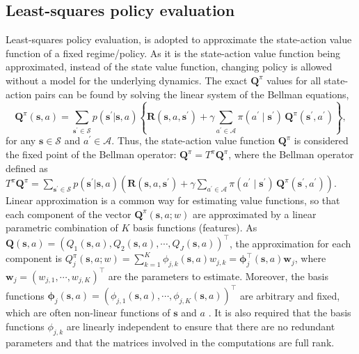 \documentclass{article}
\newcommand{\p}{\prime}
\newcommand{\bs}{ \boldsymbol}
\newcommand{\ml}{\mathcal}
\newcommand{\lt}{\left}
\newcommand{\rt}{\right}
\begin{document}
\subsection{Least-squares policy evaluation}
 Least-squares policy evaluation, is adopted to approximate the state-action value function of a fixed regime/policy. As it is the state-action value function being approximated, instead of the state value function, changing policy is allowed without a model for the underlying dynamics. The exact $\bs{Q}^{\pi}$ values for all state-action pairs can be found by solving the linear system of the Bellman equations, $$\bs{Q}^{\pi}(\bs{s}, a) =\sum_{\bs{s}^{\prime} \in \ml{S}}  p(\bs{s}^{\prime} | \bs{s}, a) \lt\{ \bs{R}(\bs{s}, a, \bs{s}^{\prime}) + \gamma \sum_{a^{\p} \in \ml{A}} \pi(a^{\prime} \mid \bs{s}^{\p} ) \,\bs{Q}^{\pi}(\bs{s}^{\prime}, a^{\prime} ) \rt\},$$ for any $\bs{s} \in \ml{S}$ and $a^{\prime} \in \ml{A}$. Thus,  the state-action value function $\bs{Q}^{\pi}$ is considered the fixed point of the Bellman operator: $\bs{Q}^{\pi}=T^{\pi}\bs{Q}^{\pi}$, where the Bellman operator defined as \\  $T^{\pi}\bs{Q}^{\pi} =\sum_{\bs{s}^{\prime} \in \ml{S}}  p(\bs{s}^{\prime} | \bs{s}, a) \lt( \bs{R}(\bs{s}, a, \bs{s}^{\prime}) + \gamma \sum_{a^{\p} \in \ml{A}} \pi(a^{\prime} \mid \bs{s}^{\p} ) \,\bs{Q}^{\pi}(\bs{s}^{\prime}, a^{\prime} ) \rt)$.\\


Linear approximation is a  common way for estimating value functions, so that each component of the vector $\bs{Q}^{\pi}(\bs{s},a;w)$ are approximated by a linear parametric combination of $K$ basis functions (features). As $\bs{Q}(\bs{s},a) = (Q_1(\bs{s},a), Q_2(\bs{s},a), \cdots, Q_{J}(\bs{s},a))^{\intercal}$, the approximation for each component is $Q_j^{\pi}(\bs{s},a;w) = \sum_{k=1}^K \phi_{j,k}(\bs{s},a)w_{j,k} =  \bs{\phi}_{j}^{\intercal}(\bs{s}, a)\bs{w}_j$, where $\bs{w}_j = (w_{j,1}, \cdots, w_{j,K})^{\intercal}$ are the parameters to estimate. Moreover, the basis functions $\bs{\phi}_{j}(\bs{s}, a) = (\phi_{j,1}(\bs{s}, a), \cdots, \phi_{j,K}(\bs{s}, a))^{\intercal}$ are arbitrary and fixed, which are often non-linear functions of $\bs{s}$ and $a$ . It is also required that the basis functions $\phi_{j,k}$ are linearly independent to ensure that there are no redundant parameters and that the matrices involved in the computations are full rank. \\
\end{document}
